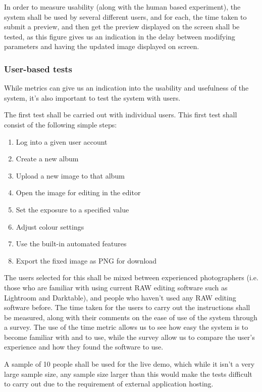 \documentclass[12pt,a4paper]{article}
\begin{document}
In order to measure usability (along with the human based experiment), the system shall be used by
several different users, and for each, the time taken to submit a preview, and then get the preview displayed
on the screen shall be tested, as this figure gives us an indication in the delay between modifying parameters
and having the updated image displayed on screen.

\subsubsection{User-based tests}
While metrics can give us an indication into the usability and usefulness of the system,
it's also important to test the system with users.

The first test shall be carried out with individual users. This first test shall consist of
the following simple steps:

\begin{enumerate}
  \item Log into a given user account
  \item Create a new album
  \item Upload a new image to that album
  \item Open the image for editing in the editor
  \item Set the exposure to a specified value
  \item Adjust colour settings
  \item Use the built-in automated features
  \item Export the fixed image as PNG for download
\end{enumerate}

The users selected for this shall be mixed between experienced photographers (i.e. those
who are familiar with using current RAW editing software such as Lightroom and Darktable), and
people who haven't used any RAW editing software before. The time taken for the users to carry
out the instructions shall be measured, along with their comments on the ease of use of the system through a survey.
The use of the time metric allows us to see how easy the system is to become familiar with and to use, while the survey
allow us to compare the user's experience and how they found the software to use.

A sample of 10 people shall be used for the live demo, which while it isn't a very large sample size,
any sample size larger than this would make the tests difficult to carry out due to the requirement of external
application hosting.
\end{document}
